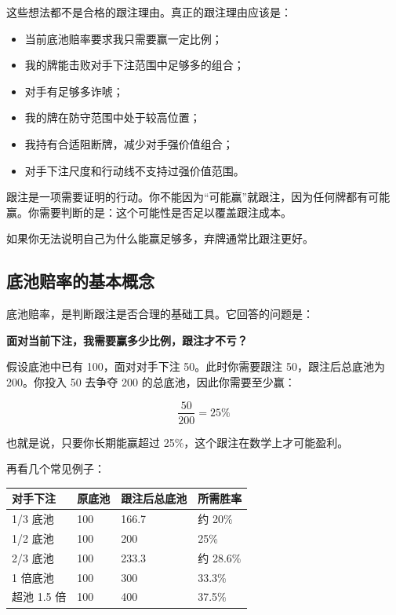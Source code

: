 这些想法都不是合格的跟注理由。真正的跟注理由应该是：

\begin{itemize}
\item 当前底池赔率要求我只需要赢一定比例；
\item 我的牌能击败对手下注范围中足够多的组合；
\item 对手有足够多诈唬；
\item 我的牌在防守范围中处于较高位置；
\item 我持有合适阻断牌，减少对手强价值组合；
\item 对手下注尺度和行动线不支持过强价值范围。
\end{itemize}

跟注是一项需要证明的行动。你不能因为“可能赢”就跟注，因为任何牌都有可能赢。你需要判断的是：这个可能性是否足以覆盖跟注成本。

如果你无法说明自己为什么能赢足够多，弃牌通常比跟注更好。

\subsection{底池赔率的基本概念}

底池赔率，是判断跟注是否合理的基础工具。它回答的问题是：

\begin{center}
\textbf{面对当前下注，我需要赢多少比例，跟注才不亏？}
\end{center}

假设底池中已有 100，面对对手下注 50。此时你需要跟注 50，跟注后总底池为 200。你投入 50 去争夺 200 的总底池，因此你需要至少赢：

\[
\frac{50}{200} = 25\%
\]

也就是说，只要你长期能赢超过 25\%，这个跟注在数学上才可能盈利。

再看几个常见例子：

\begin{center}
\begin{tabular}{llll}
\toprule
\textbf{对手下注} & \textbf{原底池} & \textbf{跟注后总底池} & \textbf{所需胜率} \\
\midrule
1/3 底池 & 100 & 166.7 & 约 20\% \\
1/2 底池 & 100 & 200 & 25\% \\
2/3 底池 & 100 & 233.3 & 约 28.6\% \\
1 倍底池 & 100 & 300 & 33.3\% \\
超池 1.5 倍 & 100 & 400 & 37.5\% \\
\bottomrule
\end{tabular}
\end{center}

